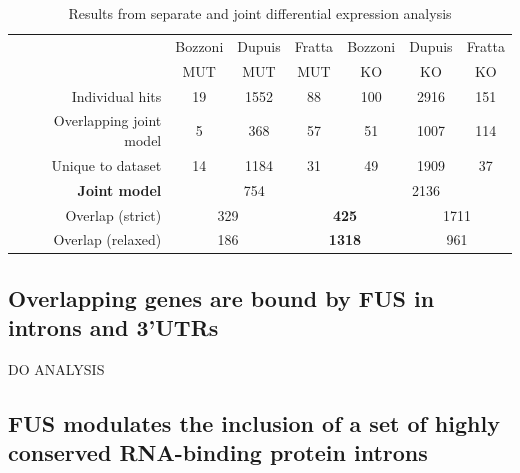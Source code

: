 \begingroup
\renewcommand{\arraystretch}{1.5}
\begin{table}[h!]
		\begin{tabular}{|r|ccc|ccc|}
			\hline
			& Bozzoni & Dupuis & Fratta & Bozzoni & Dupuis & Fratta\\[-0.3cm]
			& MUT & MUT & MUT & KO & KO & KO\\
			\hline
			Individual hits                & 19 & 1552 & 88 & 100 & 2916 & 151 \\
			Overlapping joint model & 5 & 368 & 57 & 51 & 1007 & 114 \\
			Unique to dataset          & 14 & 1184 & 31 & 49 & 1909 & 37 \\
			\hline
			\textbf{Joint model}       & \multicolumn{3}{c|}{754} & \multicolumn{3}{c|}{2136} \\
			\hline
			Overlap (strict)              & \multicolumn{2}{c}{329} & \multicolumn{2}{|c|}{\textbf{425}} & \multicolumn{2}{c|}{1711} \\
			Overlap (relaxed)           & \multicolumn{2}{c}{186} & \multicolumn{2}{|c|}{\textbf{1318} } & \multicolumn{2}{c|}{961} \\
			\hline
		\end{tabular}
	\caption{Results from separate and joint differential expression analysis}
	\label{tab:expression_results}
\end{table}
\endgroup


\subsection{ Overlapping genes are bound by FUS in introns and 3'UTRs}

DO ANALYSIS



\subsection{FUS modulates the inclusion of a set of highly conserved RNA-binding protein introns}

